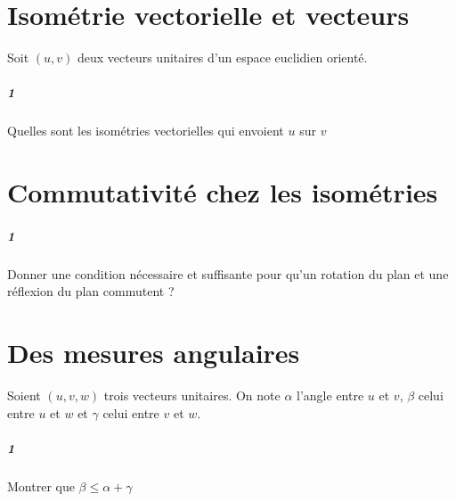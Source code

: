 \documentclass[10pt,a4paper]{article}
\begin{document}
\section{Isométrie vectorielle et vecteurs}
Soit $(u,v)$ deux vecteurs unitaires d'un espace euclidien orienté.
\subparagraph{1}Quelles sont les isométries vectorielles qui envoient $u$ sur $v$

\section{Commutativité chez les isométries}
\subparagraph{1}Donner une condition nécessaire et suffisante pour qu'un rotation du plan et une réflexion du plan commutent ?

\section{Des mesures angulaires}
Soient $(u,v,w)$ trois vecteurs unitaires. On note $\alpha$ l'angle entre $u$ et $v$, $\beta$ celui entre $u$ et $w$ et $\gamma$ celui entre $v$ et $w$.
\subparagraph{1}Montrer que $\beta \le \alpha + \gamma$
\end{document}
